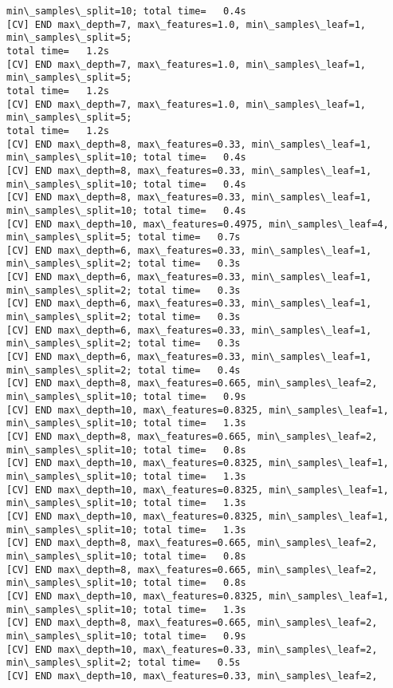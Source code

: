 \documentclass[11pt]{article}
\begin{document}
\begin{Verbatim}[commandchars=\\\{\}]
min\_samples\_split=10; total time=   0.4s
[CV] END max\_depth=7, max\_features=1.0, min\_samples\_leaf=1, min\_samples\_split=5;
total time=   1.2s
[CV] END max\_depth=7, max\_features=1.0, min\_samples\_leaf=1, min\_samples\_split=5;
total time=   1.2s
[CV] END max\_depth=7, max\_features=1.0, min\_samples\_leaf=1, min\_samples\_split=5;
total time=   1.2s
[CV] END max\_depth=8, max\_features=0.33, min\_samples\_leaf=1,
min\_samples\_split=10; total time=   0.4s
[CV] END max\_depth=8, max\_features=0.33, min\_samples\_leaf=1,
min\_samples\_split=10; total time=   0.4s
[CV] END max\_depth=8, max\_features=0.33, min\_samples\_leaf=1,
min\_samples\_split=10; total time=   0.4s
[CV] END max\_depth=10, max\_features=0.4975, min\_samples\_leaf=4,
min\_samples\_split=5; total time=   0.7s
[CV] END max\_depth=6, max\_features=0.33, min\_samples\_leaf=1,
min\_samples\_split=2; total time=   0.3s
[CV] END max\_depth=6, max\_features=0.33, min\_samples\_leaf=1,
min\_samples\_split=2; total time=   0.3s
[CV] END max\_depth=6, max\_features=0.33, min\_samples\_leaf=1,
min\_samples\_split=2; total time=   0.3s
[CV] END max\_depth=6, max\_features=0.33, min\_samples\_leaf=1,
min\_samples\_split=2; total time=   0.3s
[CV] END max\_depth=6, max\_features=0.33, min\_samples\_leaf=1,
min\_samples\_split=2; total time=   0.4s
[CV] END max\_depth=8, max\_features=0.665, min\_samples\_leaf=2,
min\_samples\_split=10; total time=   0.9s
[CV] END max\_depth=10, max\_features=0.8325, min\_samples\_leaf=1,
min\_samples\_split=10; total time=   1.3s
[CV] END max\_depth=8, max\_features=0.665, min\_samples\_leaf=2,
min\_samples\_split=10; total time=   0.8s
[CV] END max\_depth=10, max\_features=0.8325, min\_samples\_leaf=1,
min\_samples\_split=10; total time=   1.3s
[CV] END max\_depth=10, max\_features=0.8325, min\_samples\_leaf=1,
min\_samples\_split=10; total time=   1.3s
[CV] END max\_depth=10, max\_features=0.8325, min\_samples\_leaf=1,
min\_samples\_split=10; total time=   1.3s
[CV] END max\_depth=8, max\_features=0.665, min\_samples\_leaf=2,
min\_samples\_split=10; total time=   0.8s
[CV] END max\_depth=8, max\_features=0.665, min\_samples\_leaf=2,
min\_samples\_split=10; total time=   0.8s
[CV] END max\_depth=10, max\_features=0.8325, min\_samples\_leaf=1,
min\_samples\_split=10; total time=   1.3s
[CV] END max\_depth=8, max\_features=0.665, min\_samples\_leaf=2,
min\_samples\_split=10; total time=   0.9s
[CV] END max\_depth=10, max\_features=0.33, min\_samples\_leaf=2,
min\_samples\_split=2; total time=   0.5s
[CV] END max\_depth=10, max\_features=0.33, min\_samples\_leaf=2,

\end{Verbatim}
\end{document}
